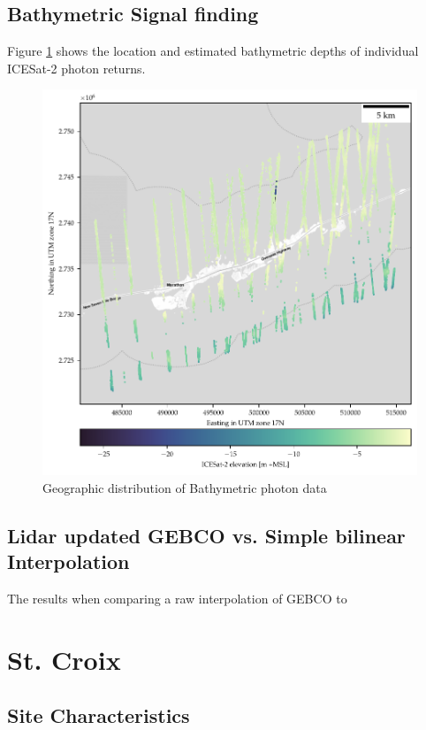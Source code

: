 \subsection{Bathymetric Signal finding}
Figure \ref{fig:keys-photons} shows the location and estimated bathymetric depths of individual ICESat-2 photon returns.
\begin{figure}[h]
    \centering
    \includegraphics{figures/Florida_keys_photon_map.pdf}
    \caption{Geographic distribution of Bathymetric photon data}
    \label{fig:keys-photons}
\end{figure}

\subsection{Lidar updated GEBCO vs. Simple bilinear Interpolation}
The results when comparing a raw interpolation of GEBCO to



\section{St. Croix}

\subsection{Site Characteristics}

